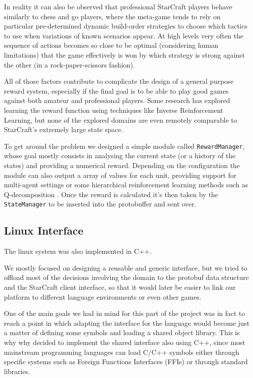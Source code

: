 In reality it can also be observed that professional StarCraft players behave
similarly to chess and go players, where the meta-game tends to rely on
particular pre-determined dynamic build-order strategies to choose which tactics
to use when variations of known scenarios appear. At high levels very often the
sequence of actions becomes so close to be optimal (considering human
limitations) that the game effectively is won by which strategy is strong
against the other (in a rock-paper-scissors fashion).

All of those factors contribute to complicate the design of a general purpose
reward system, especially if the final goal is to be able to play good games
against both amateur and professional players. Some research has explored
learning the reward function using techniques like Inverse Reinforcement
Learning\citep{ng2000algorithms}, but none of the explored domains are even
remotely comparable to StarCraft's extremely large state space.


To get around the problem we designed a simple module called
\texttt{RewardManager}, whose goal mostly consists in analysing the current
state (or a history of the states) and providing a numerical reward. Depending
on the configuration the module can also output a array of values for each unit,
providing support for multi-agent settings or some hierarchical reinforcement
learning methods such as Q-decomposition \citep{russell2003q}. Once the reward
is calculated it's then taken by the \texttt{StateManager} to be inserted into
the protobuffer and sent over.


\subsection{Linux Interface}

The linux system was also implemented in C++. 

We mostly focused on designing a reusable and generic interface, but we tried to
offload most of the decisions involving the domain to the protobuf data
structure and the StarCraft client interface, so that it
would later be easier to link our platform to different language environments or
even other games. 

One of the main goals we had in mind for this part of the project was in fact to
reach a point in which adapting the interface for the language would become just
a matter of defining some symbols and loading a shared object library. This is
why why decided to implement the shared interface also using C++, since most
mainstream programming languages can load C/C++ symbols either through specific
systems such as Foreign Functions Interfaces (FFIs) or through standard
libraries.


